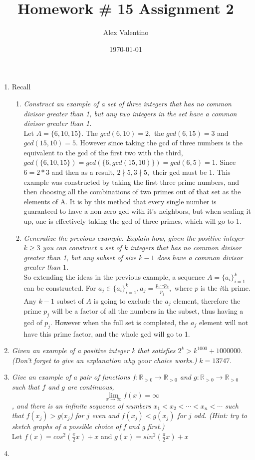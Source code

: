 \documentclass[12pt, letterpaper]{article}
\date{\today}
\title{Homework \# 15 }
\author{Alex Valentino}
\title{Assignment 2}
\newcommand{\R}{\mathbb{R}}
\begin{document}
	\begin{enumerate}
	\item Recall
		\begin{enumerate}
			\item \textit{Construct an example of a set of three integers that has no common divisor greater than
1, but any two integers in the set have a common divisor greater than 1.}\\
Let $A = \{6,10,15\}$. The $gcd(6,10) = 2,$ the $gcd(6,15) = 3$ and $gcd(15,10)=5.$  However since taking the gcd of three numbers is the equivalent to the gcd of the first two with the third, $gcd(\{6,10,15\}) = gcd(\{6,gcd(15,10)\}) = gcd(6,5) = 1.$   Since $6 = 2*3$ and then as a result, $2 \nmid 5, 3\nmid 5,$ their gcd must be 1.  This example was constructed by taking the first three prime numbers, and then choosing all the combinations of two primes out of that set as the elements of A.  It is by this method that every single number is guaranteed to have a non-zero gcd with it's neighbors, but when scaling it up, one is effectively taking the gcd of three primes, which will go to 1.
		\item \textit{Generalize the previous example. Explain how, given the positive integer $k \geq 3$ you can
construct a set of $k$ integers that has no common divisor greater than 1, but any subset
of size $k - 1$ does have a common divisor greater than $1$.}\\
		So extending the ideas in the previous example, a sequence $A = \{a_i\}^k_{i=1}$ can be constructed.  For $a_j \in \{a_i\}^k_{i=1}, a_j = \displaystyle\frac{p_1  \cdots p_k}{p_j},$ where $p$ is the $i$th prime. Any $k-1$ subset of $A$ is going to exclude the $a_j$ element, therefore the prime $p_j$ will be a factor of all the numbers in the subset, thus having a gcd of $p_j.$  However when the full set is completed, the $a_j$ element will not have this prime factor, and the whole gcd will go to 1.
		\end{enumerate}
		\item \textit{Given an example of a positive integer k that satisfies $2^k > k^{1000} + 1000000$. (Don't forget
to give an explanation why your choice works.)}
	$k=13747.$
		\item \textit{Give an example of a pair of functions $f : \R_{>0} \to \R_{>0}$ and $g : \R_{>0} \to \R_{>0}$ such that
$f$ and $g$ are continuous, \[ \lim_{x \to \infty} f (x) = \infty \], and there is an infinite sequence of numbers
$x_1 < x_2 < \cdots < x_n < \cdots$ such that $f (x_j ) > g(x_j $) for $j$ even and $f (x_j ) < g(x_j )$ for $j$ odd.
(Hint: try to sketch graphs of a possible choice of f and g first.)}\\
	Let $f(x) = cos^2(\frac{\pi}{2}x)+x$ and $g(x) = sin^2(\frac{\pi}{2}x)+x$
	\item 
	\end{enumerate}
\end{document}
